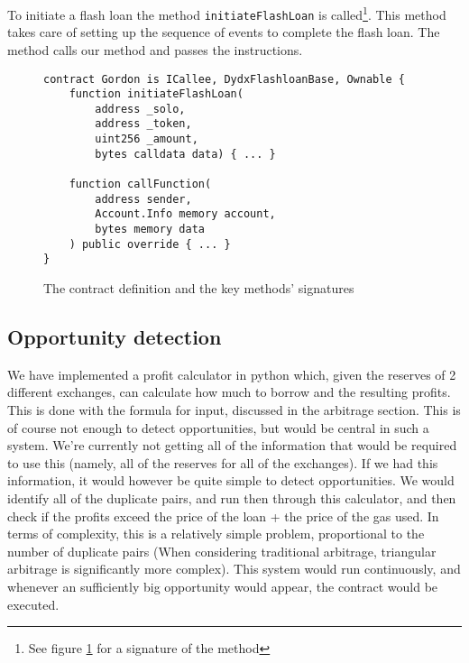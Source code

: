 \noindent To initiate a flash loan the method \verb|initiateFlashLoan| is
called\footnote{See figure \ref{signature} for a signature of the method}. This
method takes care of setting up the sequence of events to complete the flash
loan. The method calls our  method and passes the
instructions.

\begin{figure}[H]
\begin{lstlisting}[language=Solidity,numbers=none]
contract Gordon is ICallee, DydxFlashloanBase, Ownable {
    function initiateFlashLoan(
        address _solo,
        address _token,
        uint256 _amount,
        bytes calldata data) { ... }

    function callFunction(
        address sender,
        Account.Info memory account,
        bytes memory data
    ) public override { ... }
}
\end{lstlisting}
    \caption{The contract definition and the key methods' signatures}
    \label{signature}
\end{figure}

\subsection{Opportunity detection}
We have implemented a profit calculator in python which, given the reserves of 2
different exchanges, can calculate how much to borrow and the resulting profits.
This is done with the formula for input, discussed in the arbitrage section.
This is of course not enough to detect opportunities, but would be central in
such a system. We're currently not getting all of the information that would be
required to use this (namely, all of the reserves for all of the exchanges). If
we had this information, it would however be quite simple to detect
opportunities. We would identify all of the duplicate pairs, and run then
through this calculator, and then check if the profits exceed the price of the
loan + the price of the gas used. In terms of complexity, this is a relatively
simple problem, proportional to the number of duplicate pairs (When considering
traditional arbitrage, triangular arbitrage is significantly more complex). This
system would run continuously, and whenever an sufficiently big opportunity
would appear, the contract would be executed.
